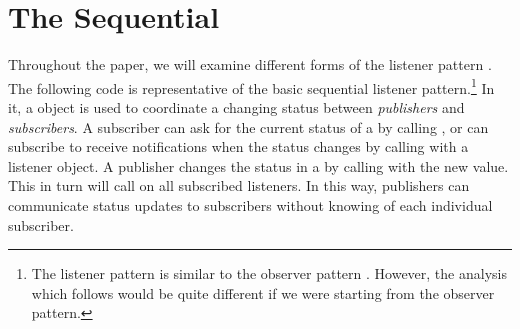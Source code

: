 \documentclass{llncs}
\begin{document}
\section{The Sequential }

Throughout the paper, we will examine different forms of the listener
pattern \cite{Englander:beans}. The following code is representative
of the basic sequential listener pattern.\footnote{
%
The listener pattern \cite{Englander:beans} is similar to the observer
pattern \cite{gamma:patterns}. However, the analysis which follows
would be quite different if we were starting from the observer
pattern.}
%
In it, a  object is used to coordinate a changing
status between \emph{publishers} and \emph{subscribers}.  A subscriber
can ask for the current status of a  by calling
, or can subscribe to receive notifications when the
status changes by calling  with a listener object.
A publisher changes the status in a  by calling
 with the new value.  This in turn will call
 on all subscribed listeners.  In this way,
publishers can communicate status updates to subscribers without
knowing of each individual subscriber.
\end{document}
